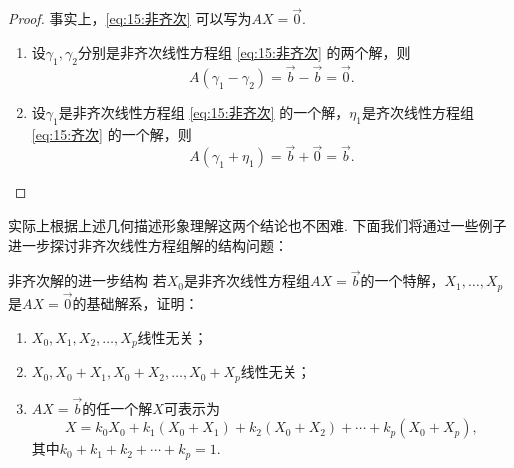 \begin{proof}
    事实上，\ref*{eq:15:非齐次} 可以写为$AX=\vec{0}$.
    \begin{enumerate}
        \item 设$\gamma_1,\gamma_2$分别是非齐次线性方程组 \ref*{eq:15:非齐次} 的两个解，则
              \[A(\gamma_1-\gamma_2)=\vec{b}-\vec{b}=\vec{0}.\]

        \item 设$\gamma_1$是非齐次线性方程组 \ref*{eq:15:非齐次} 的一个解，$\eta_1$是齐次线性方程组 \ref*{eq:15:齐次} 的一个解，则
              \[A(\gamma_1+\eta_1)=\vec{b}+\vec{0}=\vec{b}.\]
    \end{enumerate}
\end{proof}
实际上根据上述几何描述形象理解这两个结论也不困难. 下面我们将通过一些例子进一步探讨非齐次线性方程组解的结构问题：
\begin{example}{}{非齐次解的进一步结构}
    若$X_0$是非齐次线性方程组$AX=\vec{b}$的一个特解，$X_1,\ldots,X_p$是$AX=\vec{0}$的基础解系，证明：
    \begin{enumerate}
        \item $X_0,X_1,X_2,\ldots,X_p$线性无关；

        \item $X_0,X_0+X_1,X_0+X_2,\ldots,X_0+X_p$线性无关；

        \item $AX=\vec{b}$的任一个解$X$可表示为
              \[X=k_0X_0+k_1(X_0+X_1)+k_2(X_0+X_2)+\cdots+k_p(X_0+X_p),\]
              其中$k_0+k_1+k_2+\cdots+k_p=1$.
    \end{enumerate}
\end{example}

